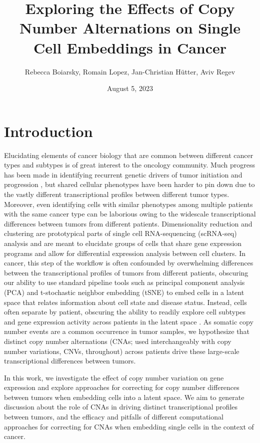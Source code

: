 \documentclass{article}
\title{Exploring the Effects of Copy Number Alternations on Single Cell Embeddings in Cancer}
\author{Rebecca Boiarsky, Romain Lopez, Jan-Christian Hütter, Aviv Regev}
\date{August 5, 2023}
\begin{document}
\maketitle

\section{Introduction}

Elucidating elements of cancer biology that are common between different cancer types and subtypes is of great interest to the oncology community. Much progress has been made in identifying recurrent genetic drivers of tumor initiation and progression \citep{alexandrov2020repertoire}, but shared cellular phenotypes have been harder to pin down due to the vastly different transcriptional profiles between different tumor types. Moreover, even identifying cells with similar phenotypes among multiple patients with the same cancer type can be laborious owing to the widescale transcriptional differences between tumors from different patients. Dimensionality reduction and clustering are prototypical parts of single cell RNA-sequencing (scRNA-seq) analysis and are meant to elucidate groups of cells that share gene expression programs and allow for differential expression analysis between cell clusters\citep{wolf2018scanpy, butler2018integrating}. In cancer, this step of the workflow is often confounded by overwhelming differences between the transcriptional profiles of tumors from different patients, obscuring our ability to use standard pipeline tools such as principal component analysis (PCA) and t-stochastic neighbor embedding (tSNE) to embed cells in a latent space that relates information about cell state and disease status. Instead, cells often separate by patient, obscuring the ability to readily explore cell subtypes and gene expression activity across patients in the latent space \citep{fan2020single, tirosh2016dissecting, boiarsky2022single, gavish2023hallmarks}. As somatic copy number events are a common occurrence in tumor samples, we hypothesize that distinct copy number alternations (CNAs; used interchangeably with copy number variations, CNVs, throughout) across patients drive these large-scale transcriptional differences between tumors.

In this work, we investigate the effect of copy number variation on gene expression and explore approaches for correcting for copy number differences between tumors when embedding cells into a latent space. We aim to generate discussion about the role of CNAs in driving distinct transcriptional profiles between tumors, and the efficacy and pitfalls of different computational approaches for correcting for CNAs when embedding single cells in the context of cancer. %
\end{document}
